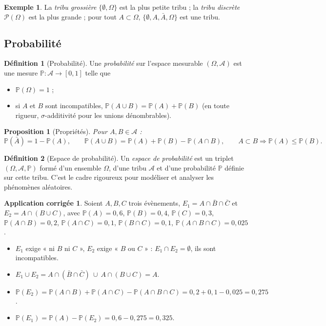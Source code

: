 \documentclass[11pt,a4paper]{article}
\renewcommand{\P}{\mathbb{P}}
\newcommand{\A}{\mathcal{A}}
\newcommand{\1}{\mathbf{1}}
\theoremstyle{definition}
\newtheorem*{definition}{Définition}
\newtheorem*{exemple}{Exemple}
\newtheorem*{application}{Application corrigée}
\theoremstyle{plain}
\newtheorem*{proposition}{Proposition}
\theoremstyle{remark}
\begin{document}
\begin{exemple}
La \emph{tribu grossière} $\{\emptyset,\Omega\}$ est la plus petite tribu ; la \emph{tribu discrète} $\mathcal{P}(\Omega)$ est la plus grande ; pour tout $A\subset\Omega$, $\{\emptyset,A,\bar A,\Omega\}$ est une tribu.
\end{exemple}

\subsection{Probabilité}

\begin{definition}[Probabilité]
Une \emph{probabilité} sur l'espace mesurable $(\Omega,\A)$ est une mesure $\P:\A\to[0,1]$ telle que
\begin{itemize}
  \item $\P(\Omega)=1$ ;
  \item si $A$ et $B$ sont incompatibles, $\P(A\cup B)=\P(A)+\P(B)$ (en toute rigueur, $\sigma$-additivité pour les unions dénombrables).
\end{itemize}
\end{definition}

\begin{proposition}[Propriétés]
Pour $A,B\in\A$ :
\[
\P(\bar A)=1-\P(A),\qquad
\P(A\cup B)=\P(A)+\P(B)-\P(A\cap B),\qquad
A\subset B\Rightarrow\P(A)\le\P(B).
\]
\end{proposition}

\begin{definition}[Espace de probabilité]
Un \emph{espace de probabilité} est un triplet $(\Omega,\A,\P)$ formé d'un ensemble $\Omega$, d'une tribu $\A$ et d'une probabilité $\P$ définie sur cette tribu. C'est le cadre rigoureux pour modéliser et analyser les phénomènes aléatoires.
\end{definition}

\begin{application}
Soient $A,B,C$ trois évènements, $E_1=A\cap\bar B\cap\bar C$ et $E_2=A\cap(B\cup C)$, avec
$\P(A)=0{,}6$, $\P(B)=0{,}4$, $\P(C)=0{,}3$, $\P(A\cap B)=0{,}2$, $\P(A\cap C)=0{,}1$, $\P(B\cap C)=0{,}1$, $\P(A\cap B\cap C)=0{,}025$.
\begin{itemize}
  \item $E_1$ exige « ni $B$ ni $C$ », $E_2$ exige « $B$ ou $C$ » : $E_1\cap E_2=\emptyset$, ils sont incompatibles.
  \item $E_1\cup E_2=A\cap(\bar B\cap\bar C)\ \cup\ A\cap(B\cup C)=A$.
  \item $\P(E_2)=\P(A\cap B)+\P(A\cap C)-\P(A\cap B\cap C)=0{,}2+0{,}1-0{,}025=0{,}275$.
  \item $\P(E_1)=\P(A)-\P(E_2)=0{,}6-0{,}275=0{,}325$.
\end{itemize}
\end{application}
\end{document}
